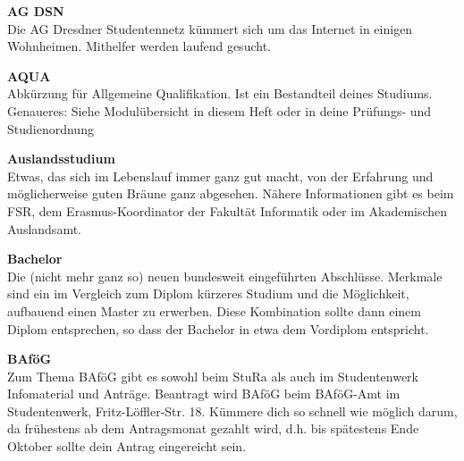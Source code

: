 
\begin{multicols}{2}

\textbf{AG DSN} \\
Die AG Dresdner Studentennetz kümmert sich um das Internet in einigen Wohnheimen.
Mithelfer werden laufend gesucht. 



\textbf{AQUA} \\
Abkürzung für Allgemeine Qualifikation.
Ist ein Bestandteil deines Studiums.
Genaueres:
Siehe Modulübersicht in diesem Heft oder in deine Prüfungs- und Studienordnung %


\textbf{Auslandsstudium} \\
Etwas, das sich im Lebenslauf immer ganz gut macht, von der Erfahrung und möglicherweise guten Bräune ganz abgesehen.
Nähere Informationen gibt es beim FSR, dem Erasmus-Koordinator der Fakultät Informatik oder im Akademischen Auslandsamt. 

\textbf{Bachelor} \\
Die (nicht mehr ganz so) neuen bundesweit eingeführten Abschlüsse. %
Merkmale sind ein im Vergleich zum Diplom kürzeres Studium und die Möglichkeit, aufbauend einen Master zu erwerben. Diese Kombination sollte dann einem Diplom entsprechen, so dass der Bachelor in etwa dem Vordiplom entspricht.

\textbf{BAföG} \\
Zum Thema BAföG gibt es sowohl beim StuRa als auch im Studentenwerk Infomaterial und Anträge.
Beantragt wird BAföG beim BAföG-Amt im Studentenwerk, Fritz-Löffler-Str. 18.
Kümmere dich so schnell wie möglich darum, da frühestens ab dem Antragsmonat gezahlt wird, d.h. bis spätestens Ende Oktober sollte dein Antrag eingereicht sein. 


\end{multicols}
